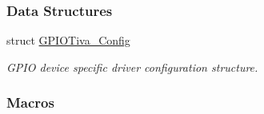 \subsubsection*{Data Structures}
\begin{DoxyCompactItemize}
\item 
struct \hyperlink{struct_g_p_i_o_tiva___config}{G\+P\+I\+O\+Tiva\+\_\+\+Config}
\begin{DoxyCompactList}\small\item\em G\+P\+I\+O device specific driver configuration structure. \end{DoxyCompactList}\end{DoxyCompactItemize}
\subsubsection*{Macros}
